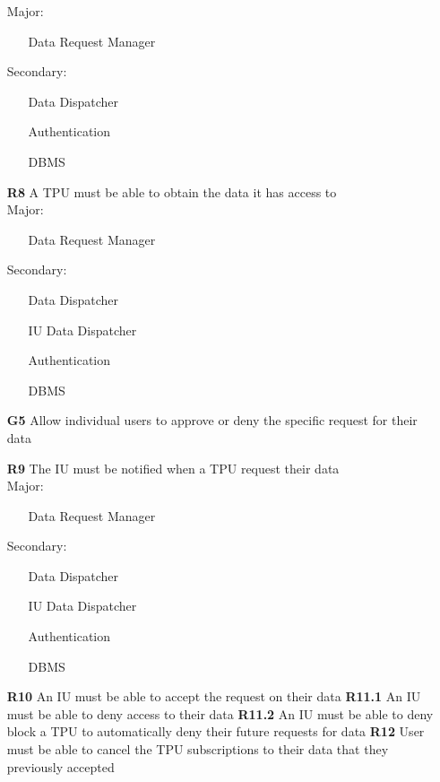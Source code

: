 \begin{itemize}
Major:
\begin{itemize}
\item[\textbullet]Data Request Manager 
\end{itemize}
Secondary:
\begin{itemize}
\item[\textbullet]Data Dispatcher
\item[\textbullet]Authentication
\item[\textbullet]DBMS
\end{itemize}


\subitem \textbf{R8} A TPU must be able to obtain the data it has access to \\

Major:
\begin{itemize}
\item[\textbullet]Data Request Manager 
\end{itemize}
Secondary:
\begin{itemize}
\item[\textbullet]Data Dispatcher
\item[\textbullet]IU Data Dispatcher
\item[\textbullet]Authentication
\item[\textbullet]DBMS
\end{itemize}

\item [\textbf{G5}] Allow individual users to approve or deny the specific request for their data

\subitem \textbf{R9} The IU must be notified when a TPU request their data\\

Major:
\begin{itemize}
\item[\textbullet]Data Request Manager 
\end{itemize}
Secondary:
\begin{itemize}
\item[\textbullet]Data Dispatcher
\item[\textbullet]IU Data Dispatcher
\item[\textbullet]Authentication
\item[\textbullet]DBMS
\end{itemize}
\subitem \textbf{R10} An IU must be able to accept the request on their data
\subitem \textbf{R11.1} An IU must be able to deny access to their data
\subitem \textbf{R11.2} An IU must be able to deny block a TPU to automatically deny their future requests for data
\subitem \textbf{R12} User must be able to cancel the TPU subscriptions to their data that they previously accepted\\


\end{itemize}
